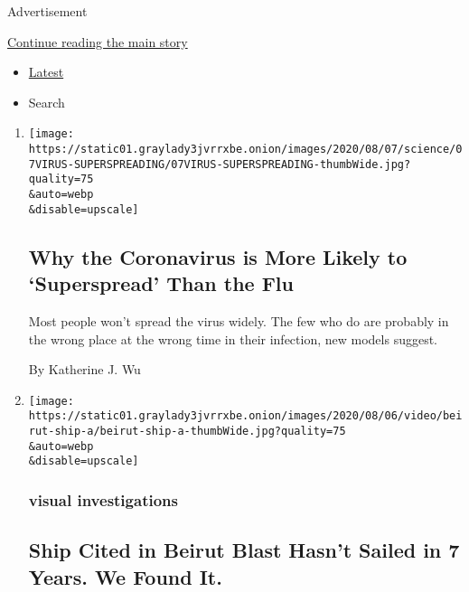 Advertisement

\protect\hyperlink{after-mid3}{Continue reading the main story}

\begin{itemize}
\tightlist
\item
  \protect\hyperlink{stream-panel}{Latest}
\item
  Search
\end{itemize}

\begin{enumerate}
\def\labelenumi{\arabic{enumi}.}
\item
  \href{/2020/08/07/health/coronavirus-superspreading-contagion.html}{}

  \texttt{[image: https://static01.graylady3jvrrxbe.onion/images/2020/08/07/science/07VIRUS-SUPERSPREADING/07VIRUS-SUPERSPREADING-thumbWide.jpg?quality=75\\\&auto=webp\\\&disable=upscale]}

  \hypertarget{why-the-coronavirus-is-more-likely-to-superspread-than-the-flu}{%
  \subsection{Why the Coronavirus is More Likely to `Superspread' Than
  the
  Flu}\label{why-the-coronavirus-is-more-likely-to-superspread-than-the-flu}}

  Most people won't spread the virus widely. The few who do are probably
  in the wrong place at the wrong time in their infection, new models
  suggest.

  By Katherine J. Wu
\item
  \href{/2020/08/07/world/middleeast/lebanon-explosion-ship.html}{}

  \texttt{[image: https://static01.graylady3jvrrxbe.onion/images/2020/08/06/video/beirut-ship-a/beirut-ship-a-thumbWide.jpg?quality=75\\\&auto=webp\\\&disable=upscale]}

  \hypertarget{visual-investigations}{%
  \subsubsection{visual investigations}\label{visual-investigations}}

  \hypertarget{ship-cited-in-beirut-blast-hasnt-sailed-in-7-years-we-found-it}{%
  \subsection{Ship Cited in Beirut Blast Hasn't Sailed in 7 Years. We
  Found
  It.}\label{ship-cited-in-beirut-blast-hasnt-sailed-in-7-years-we-found-it}}


\end{enumerate}
